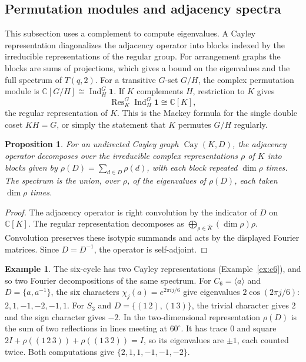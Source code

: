 \documentclass[12pt,letterpaper]{article}
\numberwithin{equation}{section}
\newtheorem{proposition}[theorem]{Proposition}
\theoremstyle{definition}
\newtheorem{example}[theorem]{Example}
\DeclareMathOperator{\cayy}{Cay}
\DeclareMathOperator{\Ind}{Ind}
\DeclareMathOperator{\Res}{Res}
\begin{document}
\subsection{Permutation modules and adjacency spectra}
This subsection uses a complement to compute eigenvalues. A Cayley representation diagonalizes the adjacency operator into blocks indexed by the irreducible representations of the regular group. For arrangement graphs the blocks are sums of projections, which gives a bound on the eigenvalues and the full spectrum of $T(q,2)$. For a transitive $G$-set $G/H$, the complex permutation module is $\mathbb C[G/H]\cong\Ind_H^G\mathbf1$. If $K$ complements $H$, restriction to $K$ gives
\begin{equation}\label{eq:regularmodule}
\Res^{G}_{K}\Ind_{H}^{G}\mathbf1\cong\mathbb C[K],
\end{equation}
the regular representation of $K$. This is the Mackey formula for the single double coset $KH=G$, or simply the statement that $K$ permutes $G/H$ regularly.
\begin{proposition}\label{prop:spectrum}
For an undirected Cayley graph $\cayy(K,D)$, the adjacency operator decomposes over the irreducible complex representations $\rho$ of $K$ into blocks given by $\rho(D)=\sum_{d\in D}\rho(d)$, with each block repeated $\dim\rho$ times. The spectrum is the union, over $\rho$, of the eigenvalues of $\rho(D)$, each taken $\dim\rho$ times.
\end{proposition}
\begin{proof}
The adjacency operator is right convolution by the indicator of $D$ on $\mathbb C[K]$. The regular representation decomposes as $\bigoplus_{\rho\in\widehat K}(\dim\rho)\rho$. Convolution preserves these isotypic summands and acts by the displayed Fourier matrices. Since $D=D^{-1}$, the operator is self-adjoint.
\end{proof}
\begin{example}\label{ex:c6spec}
The six-cycle has two Cayley representations (Example~\ref{ex:c6}), and so two Fourier decompositions of the same spectrum. For $C_6=\langle a\rangle$ and $D=\{a,a^{-1}\}$, the six characters $\chi_j(a)=e^{2\pi i j/6}$ give eigenvalues $2\cos(2\pi j/6)$: $2,1,-1,-2,-1,1$. For $S_3$ and $D=\{(1\,2),(1\,3)\}$, the trivial character gives $2$ and the sign character gives $-2$. In the two-dimensional representation $\rho(D)$ is the sum of two reflections in lines meeting at $60^\circ$. It has trace $0$ and square $2I+\rho((1\,2\,3))+\rho((1\,3\,2))=I$, so its eigenvalues are $\pm1$, each counted twice. Both computations give $\{2,1,1,-1,-1,-2\}$.
\end{example}
\end{document}
